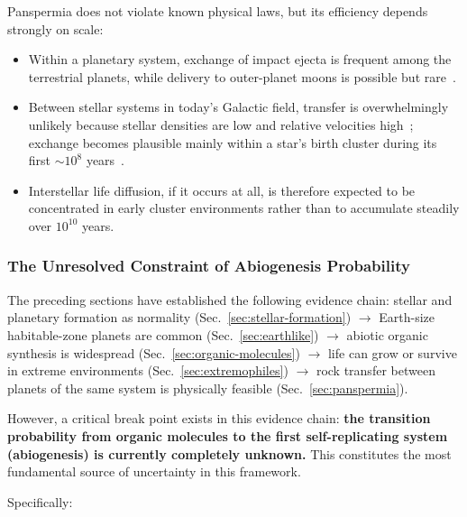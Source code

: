 \documentclass[aps,prd,twocolumn,superscriptaddress,nofootinbib]{revtex4-2}
\begin{document}
Panspermia does not violate known physical laws, but its efficiency depends strongly on scale:

\begin{itemize}
  \item Within a planetary system, exchange of impact ejecta is frequent among the terrestrial planets, while delivery to outer-planet moons is possible but rare~\cite{Worth2013}.
  \item Between stellar systems in today's Galactic field, transfer is overwhelmingly unlikely because stellar densities are low and relative velocities high~\cite{Melosh2003}; exchange becomes plausible mainly within a star's birth cluster during its first ${\sim}10^{8}$ years~\cite{Adams2005,Valtonen2009}.
  \item Interstellar life diffusion, if it occurs at all, is therefore expected to be concentrated in early cluster environments rather than to accumulate steadily over $10^{10}$ years.
\end{itemize}

\subsubsection{The Unresolved Constraint of Abiogenesis Probability}\label{sec:abiogenesis}

The preceding sections have established the following evidence chain: stellar and planetary formation as normality (Sec.~\ref{sec:stellar-formation}) $\to$ Earth-size habitable-zone planets are common (Sec.~\ref{sec:earthlike}) $\to$ abiotic organic synthesis is widespread (Sec.~\ref{sec:organic-molecules}) $\to$ life can grow or survive in extreme environments (Sec.~\ref{sec:extremophiles}) $\to$ rock transfer between planets of the same system is physically feasible (Sec.~\ref{sec:panspermia}).

However, a critical break point exists in this evidence chain: \textbf{the transition probability from organic molecules to the first self-replicating system (abiogenesis) is currently completely unknown.} This constitutes the most fundamental source of uncertainty in this framework.

Specifically:
\end{document}
